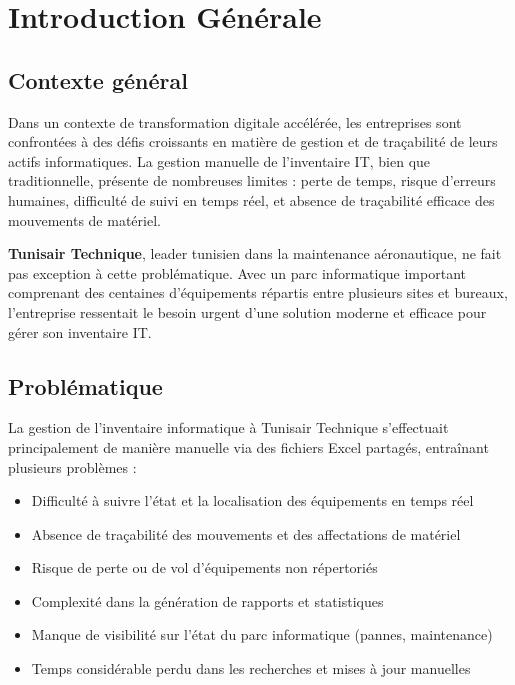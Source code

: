 \documentclass[12pt,a4paper]{report}
\begin{document}
\newpage
\chapter*{Introduction Générale}

\section*{Contexte général}

Dans un contexte de transformation digitale accélérée, les entreprises sont confrontées à des défis croissants en matière de gestion et de traçabilité de leurs actifs informatiques. La gestion manuelle de l'inventaire IT, bien que traditionnelle, présente de nombreuses limites : perte de temps, risque d'erreurs humaines, difficulté de suivi en temps réel, et absence de traçabilité efficace des mouvements de matériel.

\textbf{Tunisair Technique}, leader tunisien dans la maintenance aéronautique, ne fait pas exception à cette problématique. Avec un parc informatique important comprenant des centaines d'équipements répartis entre plusieurs sites et bureaux, l'entreprise ressentait le besoin urgent d'une solution moderne et efficace pour gérer son inventaire IT.

\section*{Problématique}

La gestion de l'inventaire informatique à Tunisair Technique s'effectuait principalement de manière manuelle via des fichiers Excel partagés, entraînant plusieurs problèmes :

\begin{itemize}[leftmargin=*]
    \item Difficulté à suivre l'état et la localisation des équipements en temps réel
    \item Absence de traçabilité des mouvements et des affectations de matériel
    \item Risque de perte ou de vol d'équipements non répertoriés
    \item Complexité dans la génération de rapports et statistiques
    \item Manque de visibilité sur l'état du parc informatique (pannes, maintenance)
    \item Temps considérable perdu dans les recherches et mises à jour manuelles
\end{itemize}
\end{document}
